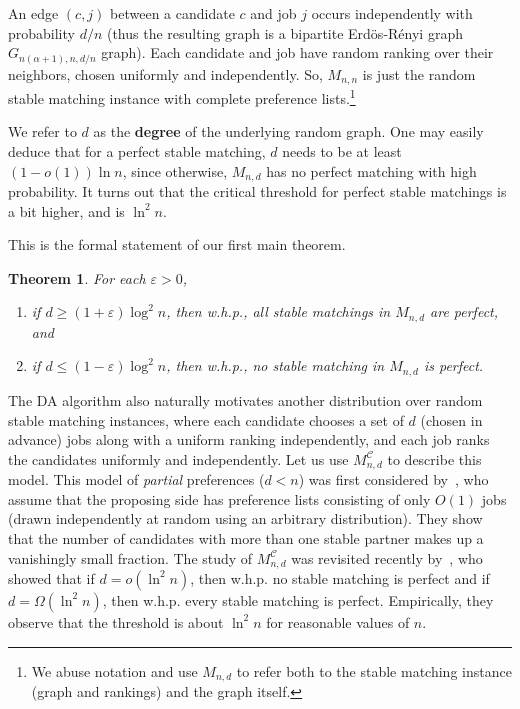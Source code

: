 \documentclass[11pt]{amsart}
\newtheorem{theorem}{Theorem}
\renewcommand{\epsilon}{\varepsilon}
\newcommand{\defn}{\textbf}
\begin{document}
An edge $(c, j)$ between a candidate $c$ and job $j$ occurs independently with probability $d/n$  (thus the resulting graph is a bipartite Erd\"{o}s-R\'{e}nyi graph $G_{n(\alpha+1),n,d/n}$ graph). 
Each candidate and job have random ranking over their neighbors, chosen uniformly and independently. So, $M_{n,n}$ is just the random stable matching instance with complete preference lists.\footnote{We abuse notation and use $M_{n,d}$ to refer both to the stable matching instance (graph and rankings) and the graph itself.} 


We refer to $d$ as the \defn{degree} of the underlying random graph.   One may easily deduce that for a perfect stable matching, $d$ needs to be at least $(1-o(1))\ln n$, since otherwise, $M_{n,d}$ has no perfect matching with high probability. It turns out that the critical threshold for perfect stable matchings is a bit higher, and is $\ln^2 n$. 

This is the formal statement of our first main theorem.


\begin{theorem}\label{thm:balancedmain}
For each $\epsilon > 0$,
\begin{enumerate}
\item if $d \geq (1 + \epsilon)\log^2 n$, then w.h.p., all stable matchings in $M_{n,d}$ are perfect, and
\item if $d \leq (1 - \epsilon)\log^2 n$, then w.h.p., no stable matching in $M_{n,d}$ is perfect.
\end{enumerate}
\end{theorem}


The DA algorithm also naturally motivates another distribution over random stable matching instances, where each candidate chooses a set of $d$ (chosen in advance) jobs along with a uniform ranking independently, and each job ranks the candidates uniformly and independently. Let us use $M_{n,d}^{\mathcal{C}}$ to describe this model. This model of \emph{partial} preferences ($d<n$) was first considered by~\cite{immorlica2005marriage, immorlica2015incentives}, who assume that the proposing side has preference lists consisting of only $O(1)$ jobs (drawn independently at random using an arbitrary distribution).  They show that the number of candidates with more than one stable partner makes up a vanishingly small fraction. The study of $M_{n,d}^{\mathcal{C}}$ was revisited recently by~\cite{kanoria2021matching}, who showed that if $d = o(\ln^2 n)$, then w.h.p. no stable matching is perfect and if $d = \Omega(\ln^2 n)$, then w.h.p. every stable matching is perfect. Empirically, they observe that the threshold is about $\ln ^2 n$ for reasonable values of $n$.
\end{document}
